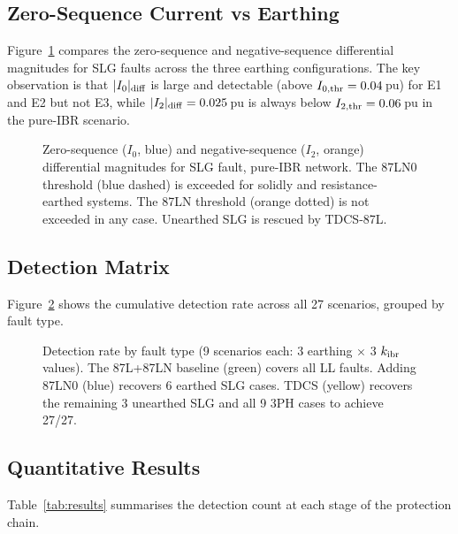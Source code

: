 \documentclass[11pt,a4paper]{article}
\begin{document}
\subsection{Zero-Sequence Current vs Earthing}

Figure~\ref{fig:I0_earthing} compares the zero-sequence and negative-sequence
differential magnitudes for SLG faults across the three earthing configurations.
The key observation is that $|I_0|_{\rm diff}$ is large and detectable
(above $I_{0,\rm thr} = 0.04$\,pu) for E1 and E2 but not E3, while
$|I_2|_{\rm diff} = 0.025$\,pu is always below $I_{2,\rm thr} = 0.06$\,pu
in the pure-IBR scenario.

\begin{figure}[h!]
  \centering
  
  \caption{Zero-sequence ($I_0$, blue) and negative-sequence ($I_2$, orange)
           differential magnitudes for SLG fault, pure-IBR network.  The 87LN0
           threshold (blue dashed) is exceeded for solidly and resistance-earthed
           systems.  The 87LN threshold (orange dotted) is not exceeded in any
           case.  Unearthed SLG is rescued by TDCS-87L.}
  \label{fig:I0_earthing}
\end{figure}

\subsection{Detection Matrix}

Figure~\ref{fig:detection_matrix} shows the cumulative detection rate across
all 27 scenarios, grouped by fault type.

\begin{figure}[h!]
  \centering
  
  \caption{Detection rate by fault type (9 scenarios each: 3 earthing $\times$
           3 $k_{\rm ibr}$ values).  The 87L+87LN baseline (green) covers all
           LL faults.  Adding 87LN0 (blue) recovers 6 earthed SLG cases.
           TDCS (yellow) recovers the remaining 3 unearthed SLG and all 9 3PH
           cases to achieve 27/27.}
  \label{fig:detection_matrix}
\end{figure}

\subsection{Quantitative Results}

Table~\ref{tab:results} summarises the detection count at each stage of the
protection chain.
\end{document}
